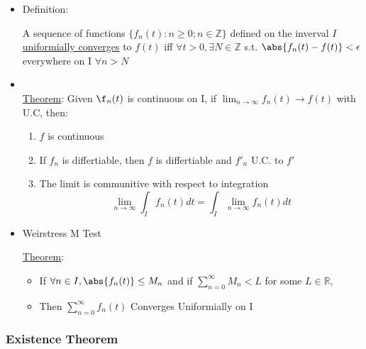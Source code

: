 \documentclass[11pt]{article}
\begin{document}
\begin{itemize}

\item Definition:\\
\label{sec-9.1.6.1}

     A sequence of functions $\{f_n(t) : n\geq 0 ; n\in\mathbb{Z}\}$
     defined on the inverval $I$ \underline{uniformially converges} to $f(t)$ iff
     $\forall t > 0, \exists N\in \mathbb{Z}$ s.t. $\abs{f_n(t)-f(t)}
     < \epsilon$ everywhere on I $\forall n > N$

\item \\


     \underline{Theorem}: Given $\f_n(t)$ is continuous on I, if
     $\lim_{n\rightarrow \infty}{f_n(t)} \rightarrow f(t)$ with U.C, then:
\begin{enumerate}
\item $f$ is continuous
\item If $f_n$ is differtiable, then $f$ is differtiable and $f'_n$
           U.C. to $f'$
\item The limit is communitive with respect to integration
          \begin{equation}
          \lim_{n\rightarrow \infty}\int_I f_n(t)dt = \int_I \lim_{n\rightarrow \infty} f_n(t) dt
          \end{equation}
\end{enumerate}

\item Weirstress M Test\\
\label{sec-9.1.6.3}

     \underline{Theorem}: 
\begin{itemize}
\item If $\forall n \in I, \abs{f_n(t)} \leq M_n$ and if $\sum_{n=0}^\infty M_n< L$ for some $L\in \mathbb{R}$,
\item Then $\sum_{n=0}^\infty f_n(t)$ Converges Uniformially on I
\end{itemize}
\end{itemize} %
\subsubsection{Existence Theorem}
\label{sec-9.1.7}
\end{document}
